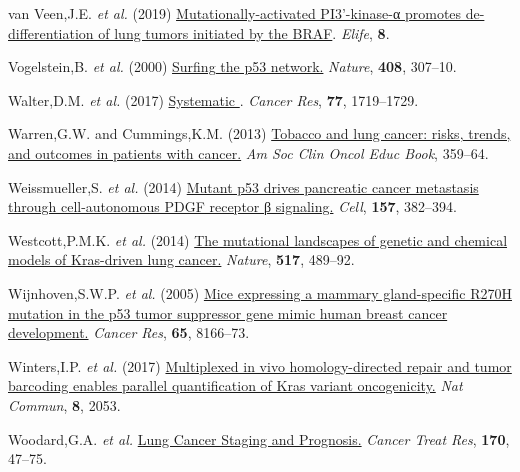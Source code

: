 \begin{CSLReferences}{1}{0}
\leavevmode{}%
van Veen,J.E. \emph{et al.} (2019) \href{https://doi.org/10.7554/elife.43668}{Mutationally-activated PI3'-kinase-α promotes de-differentiation of lung tumors initiated by the BRAF}. \emph{Elife}, \textbf{8}.

\leavevmode{}%
Vogelstein,B. \emph{et al.} (2000) \href{https://doi.org/10.1038/35042675}{Surfing the p53 network.} \emph{Nature}, \textbf{408}, 307--10.

\leavevmode{}%
Walter,D.M. \emph{et al.} (2017) \href{https://doi.org/10.1158/0008-5472.can-16-2159}{Systematic }. \emph{Cancer Res}, \textbf{77}, 1719--1729.

\leavevmode{}%
Warren,G.W. and Cummings,K.M. (2013) \href{https://doi.org/10.14694/edbook_am.2013.33.359}{Tobacco and lung cancer: risks, trends, and outcomes in patients with cancer.} \emph{Am Soc Clin Oncol Educ Book}, 359--64.

\leavevmode{}%
Weissmueller,S. \emph{et al.} (2014) \href{https://doi.org/10.1016/j.cell.2014.01.066}{Mutant p53 drives pancreatic cancer metastasis through cell-autonomous PDGF receptor β signaling.} \emph{Cell}, \textbf{157}, 382--394.

\leavevmode{}%
Westcott,P.M.K. \emph{et al.} (2014) \href{https://doi.org/10.1038/nature13898}{The mutational landscapes of genetic and chemical models of Kras-driven lung cancer.} \emph{Nature}, \textbf{517}, 489--92.

\leavevmode{}%
Wijnhoven,S.W.P. \emph{et al.} (2005) \href{https://doi.org/10.1158/0008-5472.can-05-1650}{Mice expressing a mammary gland-specific R270H mutation in the p53 tumor suppressor gene mimic human breast cancer development.} \emph{Cancer Res}, \textbf{65}, 8166--73.

\leavevmode{}%
Winters,I.P. \emph{et al.} (2017) \href{https://doi.org/10.1038/s41467-017-01519-y}{Multiplexed in vivo homology-directed repair and tumor barcoding enables parallel quantification of Kras variant oncogenicity.} \emph{Nat Commun}, \textbf{8}, 2053.

\leavevmode{}%
Woodard,G.A. \emph{et al.} \href{https://doi.org/10.1007/978-3-319-40389-2_3}{Lung Cancer Staging and Prognosis.} \emph{Cancer Treat Res}, \textbf{170}, 47--75.


\end{CSLReferences}
